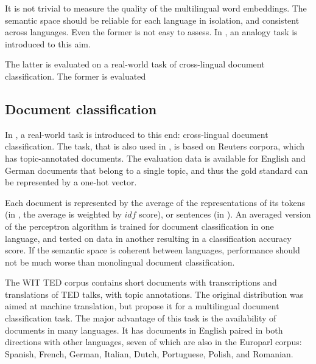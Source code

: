 

It is not trivial to measure the quality of the multilingual word embeddings. The semantic space should be reliable for each language in isolation, and consistent across languages. 
Even the former is not easy to assess. In \cite{mikolov2013efficient}, an analogy task is introduced to this aim.

The latter is evaluated on a real-world task of cross-lingual document classification. The former is evaluated




\subsection{Document classification}
In \cite{klementiev2012inducing}, a real-world task is introduced to this end: cross-lingual document classification. The task, that is also used in \cite{hermann2013multilingual}, is based on Reuters corpora, which has topic-annotated documents. The evaluation data is available for English and German documents that belong to a single topic, and thus the gold standard can be represented by a one-hot vector.

Each document is represented by the average of the representations of its tokens (in \cite{klementiev2012inducing}, the average is weighted by $idf$ score), or sentences (in \cite{hermann2013multilingual}).
An averaged version of the perceptron algorithm is trained for document classification in one language, and tested on data in another resulting in a classification accuracy score. If the semantic space is coherent between languages, performance should not be much worse than monolingual document classification.






The WIT TED corpus \cite{cettolo2012} contains short documents with transcriptions and translations of TED talks, with topic annotations. The original distribution was aimed at machine translation, but \cite{hermann2014multilingual} propose it for a multilingual document classification task. The major advantage of this task is the availability of documents in many languages. It has documents in English paired in both directions with other languages, seven of which are also in the Europarl corpus: Spanish, French, German, Italian, Dutch, Portuguese, Polish, and Romanian.

